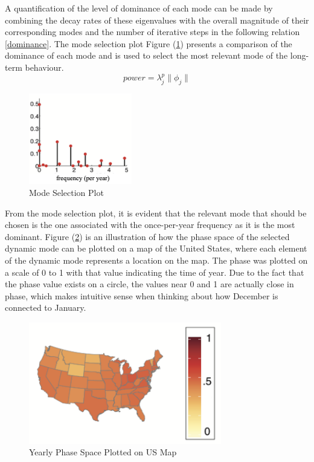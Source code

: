 \documentclass[12pt]{report}
\begin{document}
A quantification of the level of dominance of each mode can be made by combining the decay rates of these eigenvalues with the overall magnitude of their corresponding modes and the number of iterative steps in the following relation \eqref{dominance}. The mode selection plot Figure (\ref{fig:msp}) presents a comparison of the dominance of each mode and is used to select the most relevant mode of the long-term behaviour. 
\begin{equation}\label{dominance}
    power =\lambda^{p}_{j}\parallel\phi_{j}\parallel
\end{equation}

\begin{figure}[H]
    \centering
    \includegraphics[width=0.4\textwidth]{Application pics/MA680 MSP (Ep).png}
    \caption{Mode Selection Plot} \label{fig:msp}
\end{figure}
\noindent

From the mode selection plot, it is evident that the relevant mode that should be chosen is the one associated with the once-per-year frequency as it is the most dominant. Figure (\ref{fig:map}) is an illustration of how the phase space of the selected dynamic mode can be plotted on a map of the United States, where each element of the dynamic mode represents a location on the map. The phase was plotted on a scale of 0 to 1 with that value indicating the time of year. Due to the fact that the phase value exists on a circle, the values near 0 and 1 are actually close in phase, which makes intuitive sense when thinking about how December is connected to January.

\begin{figure}[H]
    \centering
    \includegraphics[width=0.75\textwidth]{Application pics/MA680 Map (Ep).png}
    \caption{Yearly Phase Space Plotted on US Map} \label{fig:map}
\end{figure}
\noindent
\end{document}
